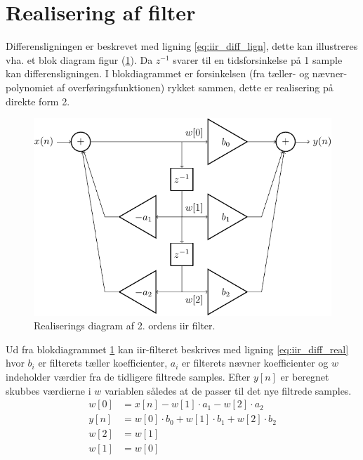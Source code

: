 \section{Realisering af filter}

Differensligningen er beskrevet med ligning \ref{eq:iir_diff_lign}, dette kan illustreres vha. et blok diagram figur (\ref{fig:real_diag}). 
Da $z^{-1}$ svarer til en tidsforsinkelse på 1 sample kan differensligningen. I blokdiagrammet er forsinkelsen 
(fra tæller- og nævner-polynomiet af overføringsfunktionen) rykket sammen, dette er realisering på direkte form 2. \cite{Tan2013}

   \begin{figure}[h]
        \centering
        \includegraphics[scale = 0.8]{figure/iir_sos-crop.pdf}
        \caption{Realiserings diagram af 2. ordens iir filter. }    
        \label{fig:real_diag}
    \end{figure}

   Ud fra blokdiagrammet \ref{fig:real_diag} kan iir-filteret beskrives med ligning \ref{eq:iir_diff_real} 
   hvor $b_i$ er filterets tæller koefficienter, $a_i$ er filterets nævner koefficienter og $w$ indeholder 
   værdier fra de tidligere filtrede samples. Efter $y[n]$ er beregnet skubbes værdierne i $w$ variablen  
 således at de passer til det nye filtrede samples. 
    \begin{align}
        w[0] &=x[n] - w[1] \cdot a_1 - w[2] \cdot a_2  \\
        y[n] &= w[0] \cdot b_0 + w[1] \cdot b_1 + w[2] \cdot b_2  
        \label{eq:iir_diff_real}
        \\
        w[2] &= w[1] \\
        w[1] &= w[0] 
    \end{align}

